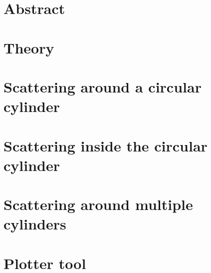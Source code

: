 \documentclass{report}
\begin{document}
    
    

\chapter*{Abstract} 
    

\chapter{Theory}
    
    

\chapter{Scattering around a circular cylinder}\label{chp:outside}
    

\chapter{Scattering inside the circular cylinder}\label{chp:inside}
  

\chapter{Scattering around multiple cylinders}
  

\chapter{Plotter tool}
    

\printbibliography
{}
\end{document}
